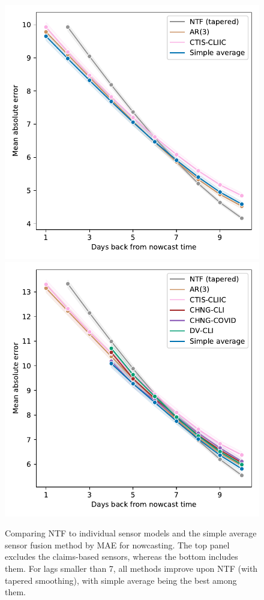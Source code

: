 \documentclass[sts]{imsart}
\theoremstyle{plain}
\theoremstyle{definition}
\theoremstyle{remark}
\begin{document}
\begin{figure}[tb]
\centering 
\includegraphics[width=0.825\linewidth]{./figures/lineplot_no_claims_no_google_aa.pdf} 
\includegraphics[width=0.825\linewidth]{./figures/lineplot_claims_no_google_aa.pdf}
\caption{Comparing NTF to individual sensor models and the simple average sensor
  fusion method by MAE for nowcasting. The top panel excludes the claims-based
  sensors, whereas the bottom includes them. For lags smaller than 7, all
  methods improve upon NTF (with tapered smoothing), with simple average being 
  the best among them.}    
\label{fig:mae_all_no_google_aa}
\end{figure}
\end{document}
